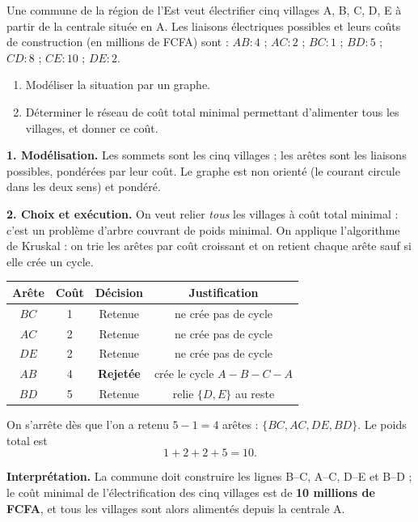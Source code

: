 \documentclass[11pt]{article}
\newcommand{\cle}[1]{{\popxbold\color{popdark}#1}}
\begin{document}
\begin{exoresolu}
Une commune de la région de l'Est veut électrifier cinq villages A, B, C, D, E à partir de la centrale située en A. Les liaisons électriques possibles et leurs coûts de construction (en millions de FCFA) sont :
$AB : 4$ ; $AC : 2$ ; $BC : 1$ ; $BD : 5$ ; $CD : 8$ ; $CE : 10$ ; $DE : 2$.
\begin{enumerate}
\item Modéliser la situation par un graphe.
\item Déterminer le réseau de coût total minimal permettant d'alimenter tous les villages, et donner ce coût.
\end{enumerate}
\tcblower
\textbf{1. Modélisation.} Les sommets sont les cinq villages ; les arêtes sont les liaisons possibles, pondérées par leur coût. Le graphe est non orienté (le courant circule dans les deux sens) et pondéré.

\textbf{2. Choix et exécution.} On veut relier \emph{tous} les villages à coût total minimal : c'est un problème d'\cle{arbre couvrant de poids minimal}. On applique l'algorithme de Kruskal : on trie les arêtes par coût croissant et on retient chaque arête sauf si elle crée un cycle.

\begin{center}
\begin{tabular}{|c|c|c|c|}
\hline
\rowcolor{popblueL}
\textbf{Arête} & \textbf{Coût} & \textbf{Décision} & \textbf{Justification} \\
\hline
$BC$ & 1 & Retenue & ne crée pas de cycle \\
\hline
$AC$ & 2 & Retenue & ne crée pas de cycle \\
\hline
$DE$ & 2 & Retenue & ne crée pas de cycle \\
\hline
$AB$ & 4 & \textbf{Rejetée} & crée le cycle $A\!-\!B\!-\!C\!-\!A$ \\
\hline
$BD$ & 5 & Retenue & relie $\{D,E\}$ au reste \\
\hline
\end{tabular}
\end{center}

On s'arrête dès que l'on a retenu $5-1=4$ arêtes : $\{BC, AC, DE, BD\}$. Le poids total est
\[ 1+2+2+5 = 10. \]

\textbf{Interprétation.} La commune doit construire les lignes B--C, A--C, D--E et B--D ; le coût minimal de l'électrification des cinq villages est de \textbf{10 millions de FCFA}, et tous les villages sont alors alimentés depuis la centrale A.
\end{exoresolu}
\end{document}
